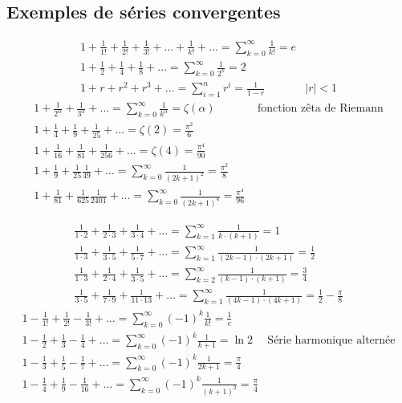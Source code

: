 \subsection{Exemples de séries convergentes}
\begin{eqnarray}
	1+\frac{1}{1!}+\frac{1}{2!}+\frac{1}{3!}+\dots+\frac{1}{k!}+\dots=\sum_{k=0}^\infty\frac{1}{k!}=e\\
	1+\frac{1}{2}+\frac{1}{4}+\frac{1}{8}+\dots=\sum_{k=0}^\infty\frac{1}{2^k}=2\\
	1+r+r^2+r^3+\dots=\sum_{i=1}^{n}r^i=\frac{1}{1-r}&|r|<1
\end{eqnarray}
\begin{eqnarray}
	1+\frac{1}{2^\alpha}+\frac{1}{3^\alpha}+\dots=\sum_{k=0}^\infty\frac{1}{k^\alpha}=\zeta(\alpha)&\text{ fonction zêta de Riemann}\\
	1+\frac{1}{4}+\frac{1}{9}+\frac{1}{25}+\dots=\zeta(2)=\frac{\pi^2}{6}\\
	1+\frac{1}{16}+\frac{1}{81}+\frac{1}{256}+\dots=\zeta(4)=\frac{\pi^4}{90}\\
	1+\frac{1}{9}+\frac{1}{25}\frac{1}{49}+\dots=\sum_{k=0}^\infty\frac{1}{(2k+1)^2}=\frac{\pi^2}{8}\\
	1+\frac{1}{81}+\frac{1}{625}\frac{1}{2401}+\dots=\sum_{k=0}^\infty\frac{1}{(2k+1)^4}=\frac{\pi^4}{96}
\end{eqnarray}

\begin{eqnarray}
	\frac{1}{1\cdot2}+\frac{1}{2\cdot3}+\frac{1}{3\cdot4}+\dots=\sum_{k=1}^\infty\frac{1}{k\cdot(k+1)}=1\\
	\frac{1}{1\cdot3}+\frac{1}{3\cdot5}+\frac{1}{5\cdot7}+\dots=\sum_{k=1}^\infty\frac{1}{(2k-1)\cdot(2k+1)}=\frac{1}{2}\\
	\frac{1}{1\cdot3}+\frac{1}{2\cdot4}+\frac{1}{3\cdot5}+\dots=\sum_{k=2}^\infty\frac{1}{(k-1)\cdot(k+1)}=\frac{3}{4}\\
	\frac{1}{3\cdot5}+\frac{1}{7\cdot9}+\frac{1}{11\cdot13}+\dots=\sum_{k=1}^\infty\frac{1}{(4k-1)\cdot(4k+1)}=\frac{1}{2}-\frac{\pi}{8}
\end{eqnarray}
\begin{eqnarray}
	1-\frac{1}{1!}+\frac{1}{2!}-\frac{1}{3!}+\dots=\sum_{k=0}^\infty(-1)^k\frac{1}{k!}=\frac{1}{e}\\
	1-\frac{1}{2}+\frac{1}{3}-\frac{1}{4}+\dots=\sum_{k=0}^\infty(-1)^k\frac{1}{k+1}=\ln{2}&\text{Série harmonique alternée}\\
	1-\frac{1}{3}+\frac{1}{5}-\frac{1}{7}+\dots=\sum_{k=0}^\infty(-1)^k\frac{1}{2k+1}=\frac{\pi}{4}\\
	1-\frac{1}{4}+\frac{1}{9}-\frac{1}{16}+\dots=\sum_{k=0}^\infty(-1)^k\frac{1}{(k+1)^2}=\frac{\pi}{4}
\end{eqnarray}

